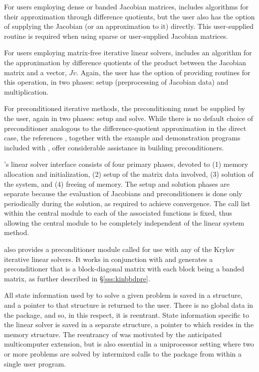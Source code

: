 For users employing dense or banded Jacobian matrices, {\kinls}
includes algorithms for their approximation through difference  
quotients, but the user also has the option of supplying the Jacobian
(or an approximation to it) directly.  This user-supplied 
routine is required when using sparse or user-supplied Jacobian
matrices.

For users employing matrix-free iterative linear solvers, {\kinls}
includes an algorithm for the approximation by difference quotients of
the product between the Jacobian matrix and a vector, $Jv$. Again, the
user has the option of providing routines for this operation, in two
phases: setup (preprocessing of Jacobian data) and multiplication.

For preconditioned iterative methods,  
the preconditioning must be supplied by the user, again in two phases: 
setup and solve.  While there is no
default choice of preconditioner analogous to the difference-quotient
approximation in the direct case, the references
\cite{BrHi:89,Byr:92}, together with the example and demonstration
programs included with {\kinsol}, offer considerable assistance in
building preconditioners. 

{\kinsol}'s linear solver interface consists of four primary phases,
devoted to (1) memory allocation and initialization, (2) setup of the
matrix data involved, (3) solution of the system, and (4) freeing of memory.
The setup and solution phases are separate because the evaluation of
Jacobians and preconditioners is done only periodically during the
solution, as required to achieve convergence. The call list within
the central {\kinsol} module to each of the associated functions is
fixed, thus allowing the central module to be completely independent
of the linear system method.

{\kinsol} also provides a preconditioner module called {\kinbbdpre} for use
with any of the Krylov iterative linear solvers. It works in conjunction
with {\nvecp} and generates a preconditioner that is
a block-diagonal matrix with each block being a banded matrix, as
further described in \S\ref{sss:kinbbdpre}.

All state information used by {\kinsol} to solve a given problem is saved
in a structure, and a pointer to that structure is returned to the
user.  There is no global data in the {\kinsol} package, and so, in this
respect, it is reentrant. State information specific to the linear
solver is saved in a separate structure, a pointer to which resides in
the {\kinsol} memory structure. The reentrancy of {\kinsol} was motivated
by the anticipated multicomputer extension, but is also essential
in a uniprocessor setting where two or more problems are solved by
intermixed calls to the package from within a single user program.
